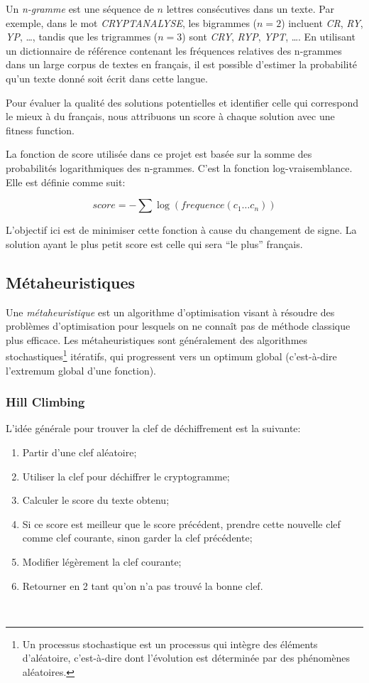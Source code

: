 \documentclass[a4paper]{article}
\begin{document}
Un \textit{n-gramme} est une séquence de $n$ lettres consécutives dans un texte. Par exemple, dans le mot \textit{CRYPTANALYSE}, les bigrammes ($n=2$) incluent \textit{CR}, \textit{RY}, \textit{YP}, \ldots, tandis que les trigrammes ($n=3$) sont \textit{CRY}, \textit{RYP}, \textit{YPT}, \ldots. 
En utilisant un dictionnaire de référence contenant les fréquences relatives des n-grammes dans un large corpus de textes en français, il est possible d'estimer la probabilité qu'un texte donné soit écrit dans cette langue.

Pour évaluer la qualité des solutions potentielles et identifier celle qui correspond le mieux à du français, nous  attribuons un score à chaque solution avec une fitness function.

La fonction de score utilisée dans ce projet est basée sur la somme des probabilités logarithmiques des n-grammes. C'est la fonction log-vraisemblance. Elle est définie comme suit:

\[
score = - \sum \log(frequence(c_1 \ldots c_n))
\]

L’objectif ici est de minimiser cette fonction à cause du changement de signe. La solution ayant le plus petit score est celle qui sera ``le plus'' français.

\subsection{Métaheuristiques}
Une \textit{métaheuristique} est un algorithme d’optimisation visant à résoudre des problèmes d’optimisation pour lesquels on ne connaît pas de méthode classique plus efficace.
Les métaheuristiques sont généralement des algorithmes stochastiques\footnote{Un processus stochastique est un processus qui intègre des éléments d'aléatoire, c'est-à-dire dont l'évolution est déterminée par des phénomènes aléatoires.} itératifs, qui progressent vers un optimum global (c'est-à-dire l'extremum global d'une fonction).
\subsubsection{Hill Climbing}

L'idée générale pour trouver la clef de déchiffrement est la suivante:
\begin{enumerate}
    \item Partir d'une clef aléatoire;
    \item Utiliser la clef pour déchiffrer le cryptogramme;
    \item Calculer le score du texte obtenu;
    \item Si ce score est meilleur que le score précédent, prendre cette nouvelle clef comme clef courante, sinon garder la clef précédente;
    \item Modifier légèrement la clef courante;
    \item Retourner en 2 tant qu'on n'a pas trouvé la bonne clef.
\end{enumerate}
\
\end{document}
